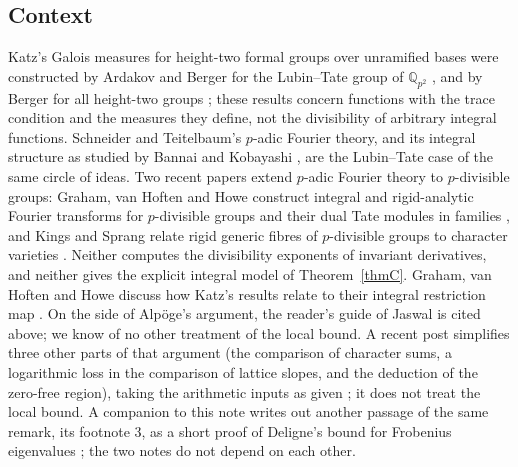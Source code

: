 \documentclass[11pt]{amsart}
\theoremstyle{definition}
\theoremstyle{remark}
\newcommand{\Q}{\mathbb Q}
\begin{document}
\subsection{Context}\label{sec:context}
Katz's Galois measures for height-two formal groups over unramified bases were constructed by Ardakov and Berger for the Lubin--Tate group of $\Q_{p^2}$ \cite{AB24}, and by Berger for all height-two groups \cite{Berger25}; these results concern functions with the trace condition and the measures they define, not the divisibility of arbitrary integral functions. Schneider and Teitelbaum's $p$-adic Fourier theory, and its integral structure as studied by Bannai and Kobayashi \cite{BK16}, are the Lubin--Tate case of the same circle of ideas. Two recent papers extend $p$-adic Fourier theory to $p$-divisible groups: Graham, van Hoften and Howe construct integral and rigid-analytic Fourier transforms for $p$-divisible groups and their dual Tate modules in families \cite[Theorems 7.0.2 and 7.2.6]{GHH25}, and Kings and Sprang relate rigid generic fibres of $p$-divisible groups to character varieties \cite[Theorem 7.1]{KS26}. Neither computes the divisibility exponents of invariant derivatives, and neither gives the explicit integral model of Theorem~\ref{thmC}. Graham, van Hoften and Howe discuss how Katz's results relate to their integral restriction map \cite[Remark 7.2.4]{GHH25}. On the side of Alp\"oge's argument, the reader's guide of Jaswal \cite{Jaswal} is cited above; we know of no other treatment of the local bound. A recent post simplifies three other parts of that argument (the comparison of character sums, a logarithmic loss in the comparison of lattice slopes, and the deduction of the zero-free region), taking the arithmetic inputs as given \cite{Three}; it does not treat the local bound. A companion to this note writes out another passage of the same remark, its footnote 3, as a short proof of Deligne's bound for Frobenius eigenvalues \cite{DeligneNote}; the two notes do not depend on each other.
\end{document}

